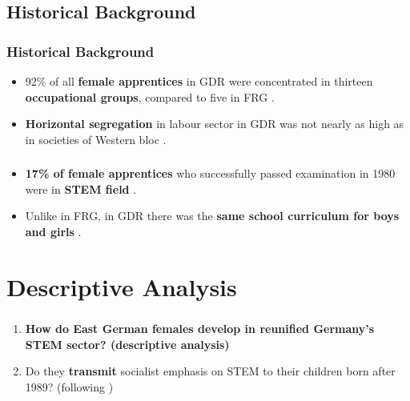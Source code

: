 \documentclass[11pt, aspectratio=1610, xcolor={dvipsnames}]{beamer}
\newcommand{\highlight}[1]{\textbf{\textcolor{PineGreen}{#1}}}
\begin{document}
	\subsection{Historical Background}
	\begin{frame}
		\frametitle{Historical Background}
		
		\begin{itemize}
			\item 92\% of all \highlight{female apprentices} in GDR were concentrated in thirteen \highlight{occupational groups}, compared to five in FRG \textcolor{darkgray}{\citep{Menschik1974}}.
			\item \highlight{Horizontal segregation} in labour sector in GDR was not nearly as high as in societies of Western bloc \textcolor{darkgray}{\citep{Lane1983}}.
		\end{itemize}
		
	\end{frame}
	
	\begin{frame}
		\frametitle{}
		
		\begin{itemize}
			\item \highlight{17\% of female apprentices} who successfully passed examination in 1980 were in \highlight{STEM field} \textcolor{darkgray}{\citep[p. 293]{DDRJahrbuch1981}}.
			\item Unlike in FRG, in GDR there was the \highlight{same school curriculum for boys and girls} \textcolor{darkgray}{\citep{FuchsSchuendeln2016, Lippmann2018}}.
		\end{itemize}
		
	\end{frame}
	
	\section{Descriptive Analysis}
	\begin{frame}
		\frametitle{}
		
		\begin{enumerate}
			\item \textbf{How do East German females develop in \highlight{reunified Germany's STEM sector}? (descriptive analysis)}
			\item Do they \highlight{transmit} socialist emphasis on STEM to their children born after 1989? (following \cite{Fernandez2011})
		\end{enumerate}
		
	\end{frame}
	
\end{document}
